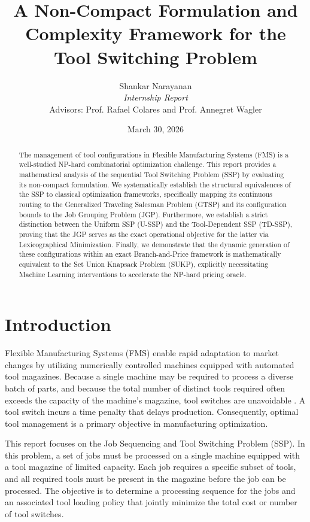 \documentclass[12pt]{article}
\begin{document}
	
	\title{A Non-Compact Formulation and Complexity Framework for the Tool Switching Problem}
	\author{Shankar Narayanan \\
		\textit{Internship Report} \\
		Advisors: Prof. Rafael Colares and Prof. Annegret Wagler}
	\date{March 30, 2026}
	\maketitle
	
	\begin{abstract}
		The management of tool configurations in Flexible Manufacturing Systems (FMS) is a well-studied NP-hard combinatorial optimization challenge. This report provides a mathematical analysis of the sequential Tool Switching Problem (SSP) by evaluating its non-compact formulation. We systematically establish the structural equivalences of the SSP to classical optimization frameworks, specifically mapping its continuous routing to the Generalized Traveling Salesman Problem (GTSP) and its configuration bounds to the Job Grouping Problem (JGP). Furthermore, we establish a strict distinction between the Uniform SSP (U-SSP) and the Tool-Dependent SSP (TD-SSP), proving that the JGP serves as the exact operational objective for the latter via Lexicographical Minimization. Finally, we demonstrate that the dynamic generation of these configurations within an exact Branch-and-Price framework is mathematically equivalent to the Set Union Knapsack Problem (SUKP), explicitly necessitating Machine Learning interventions to accelerate the NP-hard pricing oracle.
	\end{abstract}
	
	\section{Introduction}
	
	Flexible Manufacturing Systems (FMS) enable rapid adaptation to market changes by utilizing numerically controlled machines equipped with automated tool magazines. Because a single machine may be required to process a diverse batch of parts, and because the total number of distinct tools required often exceeds the capacity of the machine's magazine, tool switches are unavoidable \citep{Tang1988}. A tool switch incurs a time penalty that delays production. Consequently, optimal tool management is a primary objective in manufacturing optimization.
	
	This report focuses on the Job Sequencing and Tool Switching Problem (SSP). In this problem, a set of jobs must be processed on a single machine equipped with a tool magazine of limited capacity. Each job requires a specific subset of tools, and all required tools must be present in the magazine before the job can be processed. The objective is to determine a processing sequence for the jobs and an associated tool loading policy that jointly minimize the total cost or number of tool switches.
	
\end{document}

